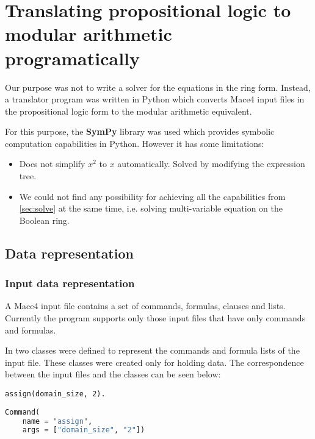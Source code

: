 \section{Translating propositional logic to modular arithmetic programatically}
\label{sec:translate}

Our purpose was not to write a solver for the equations in the ring form. Instead, a translator program was written in Python which converts Mace4 input files in the propositional logic form to the modular arithmetic equivalent.

For this purpose, the \textbf{SymPy} library was used which provides symbolic computation capabilities in Python. However it has some limitations: 

\begin{itemize}
\item Does not simplify $x^2$ to $x$ automatically. Solved by modifying the expression tree.
\item We could not find any possibility for achieving all the capabilities from \ref{sec:solve} at the same time, i.e. solving multi-variable equation on the Boolean ring.
\end{itemize}





\subsection{Data representation}

\subsubsection{Input data representation}
\label{sec:rep_input}

A Mace4 input file contains a set of commands, formulas, clauses and lists. Currently the program supports only those input files that have only commands and formulas.

In  two  classes were defined to represent the commands and formula lists of the input file. These classes were created only for holding data. The correspondence between the input files and the classes can be seen below:

\begin{multicols}{2}

\begin{lstlisting}[title=Mace4 command]
assign(domain_size, 2).
\end{lstlisting}

\columnbreak

\begin{lstlisting}[language=Python, title=Command object creation]
Command(
    name = "assign", 
    args = ["domain_size", "2"])
\end{lstlisting}

\end{multicols}

